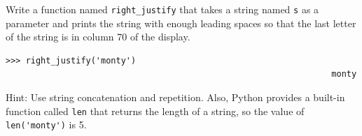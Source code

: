 \begin{exercise}

Write a function named \verb"right_justify" that takes a string
named {\tt s} as a parameter and prints the string with enough
leading spaces so that the last letter of the string is in column 70
of the display.

\begin{lstlisting}
>>> right_justify('monty')
                                                                 monty
\end{lstlisting}

Hint: Use string concatenation and repetition.  Also,
Python provides a built-in function called {\tt len} that
returns the length of a string, so the value of \verb"len('monty')" is 5.

\end{exercise}


